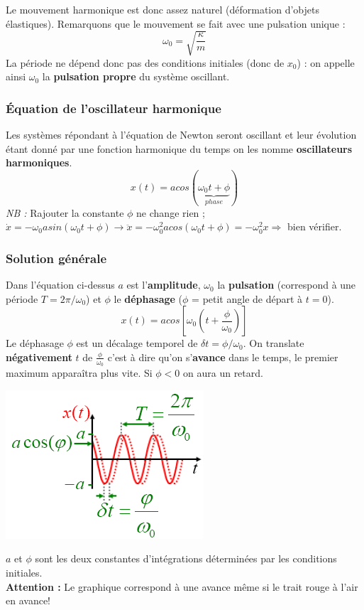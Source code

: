 \documentclass	[11pt, a4paper, openany]{book}
\begin{document}
	Le mouvement harmonique est donc assez naturel (déformation d'objets élastiques). Remarquons que le mouvement se fait avec une pulsation unique :
	\begin{equation}
		\omega_0 = \sqrt{\frac{\kappa}{m}}
	\end{equation}
	La période ne dépend donc pas des conditions initiales (donc de $x_0$) : on appelle ainsi $\omega_0$ la \textbf{pulsation propre} du système oscillant.
	
	\subsubsection*{Équation de l'oscillateur harmonique}
	Les systèmes répondant à l'équation de Newton seront oscillant et leur évolution étant donné par une fonction harmonique du temps on les nomme \textbf{oscillateurs harmoniques}.
	\begin{equation}
		x(t) = a cos(\underbrace{\omega_0 t + \phi}_{phase})
	\end{equation}
	\textit{NB :} Rajouter la constante $\phi$ ne change rien ; $\dot{x} = -\omega_0 a sin(\omega_0t+\phi) \rightarrow \ddot{x} = -\omega_0^2 a cos(\omega_0t+\phi) = -\omega_0^2 x \Rightarrow$ bien vérifier.
	
	\subsubsection*{Solution générale}
	Dans l'équation ci-dessus $a$ est l'\textbf{amplitude}, $\omega_0$ la \textbf{pulsation} (correspond à une période $T = 2\pi/\omega_0$) et $\phi$ le \textbf{déphasage} ($\phi$ = petit angle de départ à $t=0$).
	\begin{equation}
		x(t) = a cos\left[\omega_0\left(t + \frac{\phi}{\omega_0}\right)\right]
	\end{equation}
	Le déphasage $\phi$ est un décalage temporel de $\delta t = \phi/\omega_0$. On translate \textbf{négativement} $t$ de $\frac{\phi}{\omega_0}$ c'est à dire qu'on s'\textbf{avance} dans le temps, le premier maximum apparaîtra plus vite. Si $\phi < 0$ on aura un retard.
	
	\begin{center}
		\includegraphics[scale=0.55]{oo/image2.png}
	\end{center}
	$a$ et $\phi$ sont les deux constantes d'intégrations déterminées par les conditions initiales.\\
	\textbf{Attention :} Le graphique correspond à une avance même si le trait rouge à l'air en avance!
	
\end{document}
